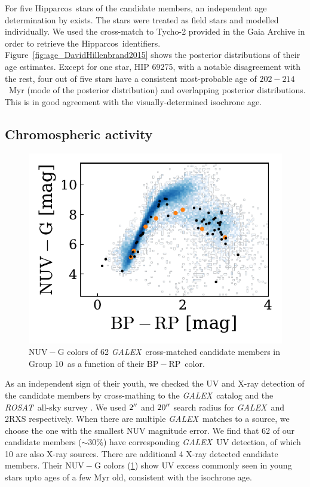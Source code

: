 \documentclass[modern,letterpaper]{aastex61}
\newcommand{\project}[1]{\textsl{#1}}
\newcommand{\acronym}[1]{{\small{#1}}}
\newcommand{\hipparcos}{Hipparcos}
\newcommand{\galex}{\project{\acronym{GALEX}}}
\newcommand{\rosat}{\project{\acronym{ROSAT}}}
\newcommand{\groupTen}{Group 10}
\newcommand{\bprp}{\ensuremath{\mathrm{BP}-\mathrm{RP}}}
\begin{document}
For five \hipparcos\ stars of the candidate members,
an independent age determination by \citet{2015ApJ...804..146D} exists.
The stars were treated as field stars and modelled individually.
We used the cross-match to Tycho-2 provided in the Gaia Archive
in order to retrieve the \hipparcos\ identifiers.
Figure~\ref{fig:age_DavidHillenbrand2015} shows the posterior distributions
of their age estimates.
Except for one star, HIP 69275, with a notable disagreement with the rest,
four out of five stars have a consistent most-probable age of $202-214$~Myr
(mode of the posterior distribution) and overlapping posterior distributions.
This is in good agreement with the visually-determined isochrone age.

\subsection{Chromospheric activity}

\begin{figure}
  \centering
  \includegraphics{nuv_xray.pdf}
  \caption{$\mathrm{NUV}-\mathrm{G}$ colors of 62 \galex\ cross-matched
    candidate members in \groupTen\ as a function of their \bprp\ color.
    }
  \label{fig:nuv}
\end{figure}



As an independent sign of their youth, we checked the UV and X-ray detection of
the candidate members by cross-mathing to the \galex\ catalog
\citep{2005ApJ...619L...1M} and the \rosat\ all-sky survey
\citep[2RXS;][]{2016A&A...588A.103B}.
We used $2\mbox{$^{\prime\prime}$}$ and $20\mbox{$^{\prime\prime}$}$ search radius for \galex\ and 2RXS respectively.
When there are multiple \galex\ matches to a source, we choose the one with
the smallest NUV magnitude error.
We find that 62 of our candidate members ($\sim30$\%) have corresponding \galex\
UV detection, of which 10 are also X-ray sources.
There are additional 4 X-ray detected candidate members.
Their $\mathrm{NUV}-\mathrm{G}$ colors (\ref{fig:nuv}) show UV excess commonly
seen in young stars upto ages of a few Myr old, consistent with the isochrone age.
\end{document}
